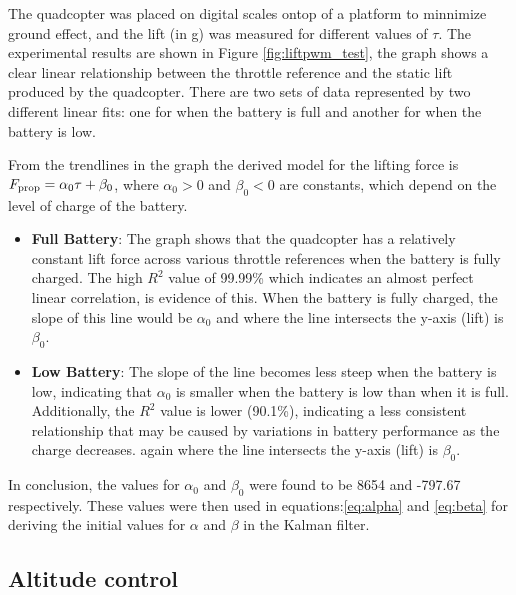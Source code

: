 \documentclass{article}
\begin{document}
The quadcopter was placed on digital scales ontop of a platform to minnimize
ground effect, and the lift (in g) was measured for different values of
\(\tau\). The experimental results are shown in Figure \ref{fig:liftpwm_test},
the graph shows a clear linear relationship between the throttle reference and
the static lift produced by the quadcopter. There are two sets of data
represented by two different linear fits: one for when the battery is full and
another for when the battery is low.

From the trendlines in the graph the derived model for the lifting force is
\(F_{\rm prop} = \alpha_0 \tau + \beta_0\), where $\alpha_0>0$ and $\beta_0<0$
are constants, which depend on the level of charge of the battery.

\begin{itemize}
  \item \textbf{Full Battery}: The graph shows that the quadcopter has a
    relatively constant lift force across various throttle references when the
    battery is fully charged. The high \(R^2\) value of 99.99\% which indicates
    an almost perfect linear correlation, is evidence of this. When the battery
    is fully charged, the slope of this line would be \(\alpha_0\) and where the
    line intersects the y-axis (lift) is \(\beta_0\).
  \item \textbf{Low Battery}: The slope of the line becomes less steep when the
    battery is low, indicating that \(\alpha_0\) is smaller when the battery is
    low than when it is full. Additionally, the \(R^2\) value is lower (90.1\%),
    indicating a less consistent relationship that may be caused by variations
    in battery performance as the charge decreases. again where the line
    intersects the y-axis (lift) is \(\beta_0\).
\end{itemize}
In conclusion, the values for \(\alpha_0\) and \(\beta_0\) were found to be 8654
and -797.67 respectively. These values were then used in
equations:\ref{eq:alpha} and \ref{eq:beta} for deriving the initial values for
\(\alpha\) and \(\beta\) in the Kalman filter.

\subsection{Altitude control}\label{altitude_cotrol_tests}
\end{document}
